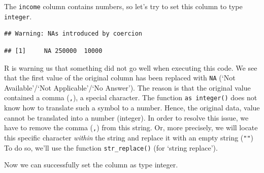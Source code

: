 \documentclass[
  12pt,
]{style/krantz}
\newenvironment{Shaded}{\begin{snugshade}}{\end{snugshade}}
\newcommand{\AttributeTok}[1]{\textcolor[rgb]{0.77,0.63,0.00}{#1}}
\newcommand{\FunctionTok}[1]{\textcolor[rgb]{0.00,0.00,0.00}{#1}}
\newcommand{\NormalTok}[1]{#1}
\newcommand{\OtherTok}[1]{\textcolor[rgb]{0.56,0.35,0.01}{#1}}
\newcommand{\SpecialCharTok}[1]{\textcolor[rgb]{0.00,0.00,0.00}{#1}}
\newcommand{\StringTok}[1]{\textcolor[rgb]{0.31,0.60,0.02}{#1}}
\begin{document}
The \texttt{income} column contains numbers, so let's try to set this column to type \texttt{integer}.

\begin{Shaded}
\end{Shaded}

\begin{verbatim}
## Warning: NAs introduced by coercion
\end{verbatim}

\begin{verbatim}
## [1]     NA 250000  10000
\end{verbatim}

R is warning us that something did not go well when executing this code. We see that the first value of the original column has been replaced with \texttt{NA} (`Not Available'/`Not Applicable'/`No Answer'). The reason is that the original value contained a comma (\texttt{,}), a special character. The function \texttt{as\ integer()} does not know how to translate such a symbol to a number. Hence, the original data, value cannot be translated into a number (integer). In order to resolve this issue, we have to remove the comma (\texttt{,}) from this string. Or, more precisely, we will locate this specific character \emph{within} the string and replace it with an empty string (\texttt{""}) To do so, we'll use the function \texttt{str\_replace()} (for `string replace').

\begin{Shaded}
\end{Shaded}

Now we can successfully set the column as type integer.

\begin{Shaded}
\end{Shaded}
\end{document}
